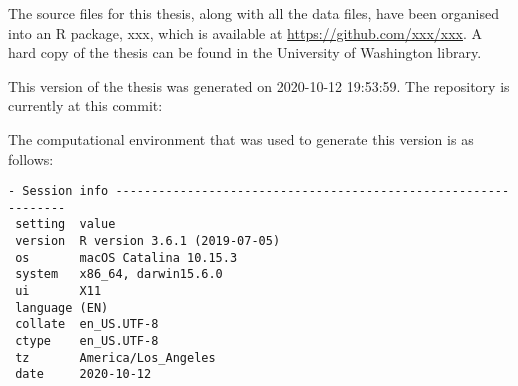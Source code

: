 \documentclass [11pt, proquest] {uwthesis}[2015/03/03]
\begin{document}
The source files for this thesis, along with all the data files, have
been organised into an R package, xxx, which is available at
\url{https://github.com/xxx/xxx}. A hard copy of the thesis can be found
in the University of Washington library.

This version of the thesis was generated on 2020-10-12 19:53:59. The
repository is currently at this commit:

The computational environment that was used to generate this version is
as follows:
\begin{verbatim}
- Session info ---------------------------------------------------------------
 setting  value                       
 version  R version 3.6.1 (2019-07-05)
 os       macOS Catalina 10.15.3      
 system   x86_64, darwin15.6.0        
 ui       X11                         
 language (EN)                        
 collate  en_US.UTF-8                 
 ctype    en_US.UTF-8                 
 tz       America/Los_Angeles         
 date     2020-10-12                  


\end{verbatim}
\end{document}
